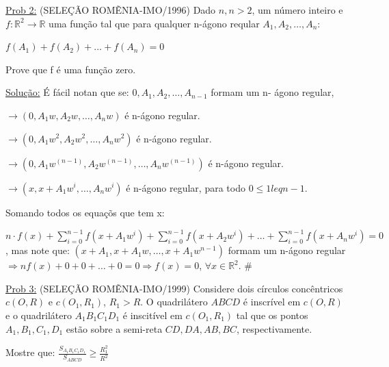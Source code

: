 \documentclass[a4paper,12pt]{article}
\renewcommand{\leq}{\ensuremath{\leqslant}}
\renewcommand{\geq}{\ensuremath{\geqslant}}
\theoremstyle{plain} %
\theoremstyle{definition} %
\theoremstyle{remark} %
\begin{document}
	\normalsize
	
	\vspace{2ex}\underline{Prob 2:} (SELE\c{C}\~AO ROM\~ENIA-IMO/1996) Dado $n,n>2$, um n\'umero inteiro e $f: \mathds{R}^2\rightarrow\mathds{R}$ uma fun\c{c}\~ao tal que para qualquer n-\'agono reqular $A_1, A_2, \dotso, A_n$:
	
	\begin{center}
		$f(A_1)+f(A_2)+\dotso+f(A_n)=0$
	\end{center}
	
	Prove que f \'e uma fun\c{c}\~ao zero.
	
	\begin{framed}
		\underline{Solu\c{c}\~ao:} \'E f\'acil notan que se: $0, A_1, A_2, \dotso, A_{n-1}$ formam um n- \'agono regular, 
		
		$\rightarrow (0, A_1w, A_2w, \dotso, A_nw)$ \'e n-\'agono regular.
		
		$\rightarrow (0, A_1w^2, A_2w^2, \dotso, A_nw^2)$ \'e n-\'agono regular.
		
		$\rightarrow (0, A_1w^(n-1), A_2w^(n-1), \dotso, A_nw^(n-1))$ \'e n-\'agono regular.
		
		$\rightarrow (x, x+A_1w^i, \dotso, A_nw^i)$ \'e n-\'agono regular, para todo $0\leq 1
		leq n-1$.
		
		Somando todos os equa\c{c}\~os que tem x:
		
		$n\cdot f(x)+\sum\limits_{i=0}^{n-1}f(x+A_1w^i)+\sum\limits_{i=0}^{n-1}f(x+A_2w^i)+\dotso+\sum\limits_{i=0}^{n-1}f(x+A_nw^i)=0$, mas note que: $(x+A_1, x+A_1w, \dotso, x+A_1w^{n-1})$ formam um n-\'agono regular $\Rightarrow nf(x)+0+0+\dotso+0=0\Rightarrow f(x)=0$, $\forall x\in \mathds{R}^2$. \huge\#
	\end{framed}
	
	\normalsize
	
	\vspace{2ex}\underline{Prob 3:} (SELE\c{C}\~AO ROM\~ENIA-IMO/1999) Considere dois c\'irculos conc\^entricos $c (O, R)$ e $c (O_1, R_1)$, $R_1>R$. O quadril\'atero $ABCD$ \'e inscr\'ivel em $c(O,R)$ e o quadril\'atero $A_1B_1C_1D_1$ \'e inscit\'ivel em $c(O_1,R_1)$ tal que os pontos $A_1, B_1, C_1, D_1$ est\~ao sobre a semi-reta $CD, DA, AB, BC$, respectivamente.
	
	Mostre que: $\displaystyle\frac{S_{A_1B_1C_1D_1}}{S_{ABCD}}\geq \frac{R_1^2}{R^2}$
	
	\vspace{1ex}
	
\end{document}
